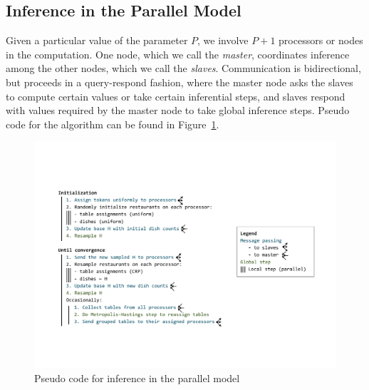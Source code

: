 \subsection{Inference in the Parallel Model}

Given a particular value of the parameter $P$, we involve $P + 1$
processors or nodes in the computation. One node, which we call the
\textit{master}, coordinates inference among the other nodes, which we
call the \textit{slaves}. Communication is bidirectional, but proceeds
in a query-respond fashion, where the master node asks the slaves to
compute certain values or take certain inferential steps, and slaves
respond with values required by the master node to take global
inference steps. Pseudo code for the algorithm can be found in
Figure~\ref{fig:inference}.

\begin{figure}[h]
  \centering
  \includegraphics[width=1.05\textwidth]{fig/parallel_code_schema}
  \caption{Pseudo code for inference in the parallel model}
  \label{fig:inference}
\end{figure}


